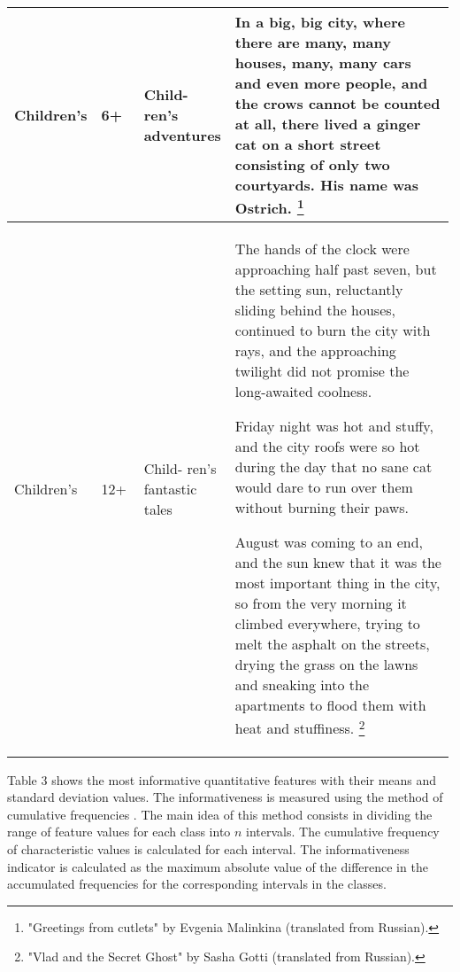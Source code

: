 \documentclass[runningheads]{llncs}
\begin{document}
\begin{longtable}{|p{0.15\linewidth}|p{0.1\linewidth}|p{0.1\linewidth}|p{0.64\linewidth}|}
Children's & 6+ &  Child- ren's adventures & In a big, big city, where there are many, many houses, many, many cars and even more people, and the crows cannot be counted at all, there lived a ginger cat on a short street consisting of only two courtyards. His name was Ostrich. \footnote{"Greetings from cutlets" by Evgenia Malinkina (translated from Russian).}\\ \hline
Children's &  12+ & Child- ren's fantastic tales &  The hands of the clock were approaching half past seven, but the setting sun, reluctantly sliding behind the houses, continued to burn the city with rays, and the approaching twilight did not promise the long-awaited coolness.

Friday night was hot and stuffy, and the city roofs were so hot during the day that no sane cat would dare to run over them without burning their paws.

August was coming to an end, and the sun knew that it was the most important thing in the city, so from the very morning it climbed everywhere, trying to melt the asphalt on the streets, drying the grass on the lawns and sneaking into the apartments to flood them with heat and stuffiness. \footnote{"Vlad and the Secret Ghost" by Sasha Gotti (translated from Russian).}\\ \hline
\end{longtable}

Table 3 shows the most informative quantitative features with their means and standard deviation values. The informativeness is measured using the method of cumulative frequencies \cite{Aivazyan,Zagoruiko}. The main idea of this method consists in dividing the range of feature values for each class into $n$ intervals. The cumulative frequency of characteristic values is calculated for each interval. The informativeness indicator is calculated as the maximum absolute value of the difference in the accumulated frequencies for the corresponding intervals in the classes.
\end{document}
